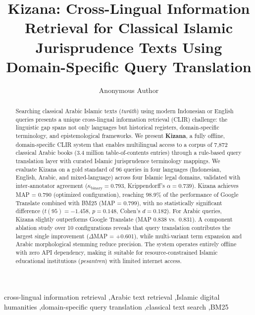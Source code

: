 \documentclass[preprint,12pt,numbers]{elsarticle}
\begin{document}
\begin{frontmatter}

\title{Kizana: Cross-Lingual Information Retrieval for Classical Islamic Jurisprudence Texts Using Domain-Specific Query Translation}

\author[inst1]{Anonymous Author}


\begin{abstract}
Searching classical Arabic Islamic texts (\textit{tur\={a}th}) using modern Indonesian or English queries presents a unique cross-lingual information retrieval (CLIR) challenge: the linguistic gap spans not only languages but historical registers, domain-specific terminology, and epistemological frameworks. We present \textbf{Kizana}, a fully offline, domain-specific CLIR system that enables multilingual access to a corpus of 7,872 classical Arabic books (3.4 million table-of-contents entries) through a rule-based query translation layer with curated Islamic jurisprudence terminology mappings. We evaluate Kizana on a gold standard of 96 queries in four languages (Indonesian, English, Arabic, and mixed-language) across four Islamic legal domains, validated with inter-annotator agreement ($\kappa_{\text{binary}} = 0.793$, Krippendorff's $\alpha = 0.739$). Kizana achieves MAP = 0.790 (optimized configuration), reaching 98.9\% of the performance of Google Translate combined with BM25 (MAP = 0.799), with no statistically significant difference ($t(95) = -1.458$, $p = 0.148$, Cohen's $d = 0.182$). For Arabic queries, Kizana slightly outperforms Google Translate (MAP 0.838 vs.\ 0.831). A component ablation study over 10 configurations reveals that query translation contributes the largest single improvement ($\Delta$MAP = +0.601), while multi-variant term expansion and Arabic morphological stemming reduce precision. The system operates entirely offline with zero API dependency, making it suitable for resource-constrained Islamic educational institutions (\textit{pesantren}) with limited internet access.
\end{abstract}

\begin{keyword}
cross-lingual information retrieval \sep Arabic text retrieval \sep Islamic digital humanities \sep domain-specific query translation \sep classical text search \sep BM25
\end{keyword}

\end{frontmatter}
\end{document}
